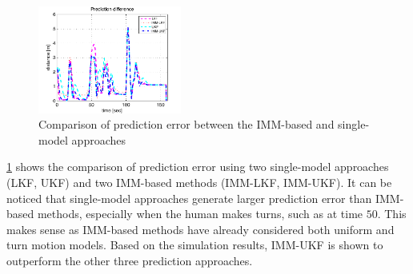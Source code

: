 \documentclass[letterpaper, 10 pt, conference]{ieeeconf}
\begin{document}
	
	\begin{figure}
		\centering
		\includegraphics[width=0.42\textwidth]{figures/imm_vs_single}
		\caption{Comparison of prediction error between the IMM-based and single-model approaches}
		\label{fig:pred}
	\end{figure}
	
	\cref{fig:pred} shows the comparison of prediction error using two single-model approaches (LKF, UKF) and two IMM-based methods (IMM-LKF, IMM-UKF).
	It can be noticed that single-model approaches generate larger prediction error than IMM-based methods, especially when the human makes turns,  such as at time $50$.
	This makes sense as IMM-based methods have already considered both uniform and turn motion models.
	Based on the simulation results, IMM-UKF is shown to outperform the other three prediction approaches.
	
\end{document}
